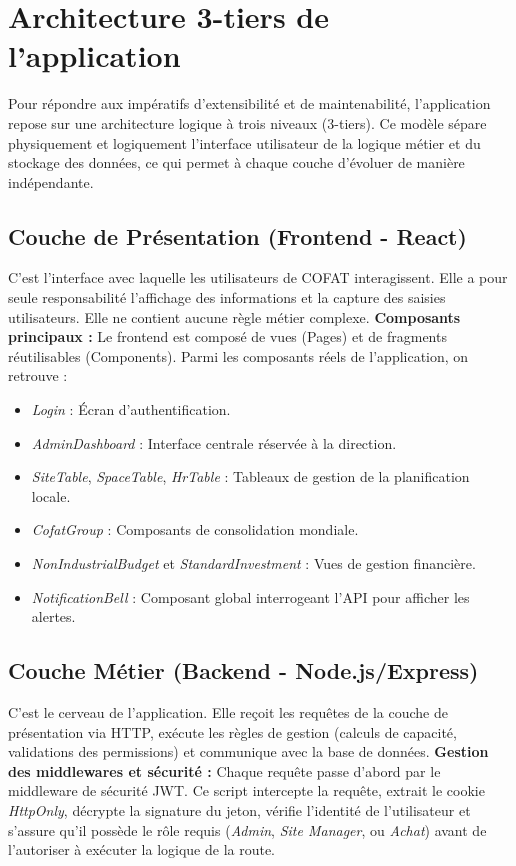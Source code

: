 \section{Architecture 3-tiers de l'application}
Pour répondre aux impératifs d'extensibilité et de maintenabilité, l'application repose sur une architecture logique à trois niveaux (3-tiers). Ce modèle sépare physiquement et logiquement l'interface utilisateur de la logique métier et du stockage des données, ce qui permet à chaque couche d'évoluer de manière indépendante.

\subsection{Couche de Présentation (Frontend - React)}
C'est l'interface avec laquelle les utilisateurs de COFAT interagissent. Elle a pour seule responsabilité l'affichage des informations et la capture des saisies utilisateurs. Elle ne contient aucune règle métier complexe.
\newline
\textbf{Composants principaux :} Le frontend est composé de vues (Pages) et de fragments réutilisables (Components). Parmi les composants réels de l'application, on retrouve :
\begin{itemize}
    \item \textit{Login} : Écran d'authentification.
    \item \textit{AdminDashboard} : Interface centrale réservée à la direction.
    \item \textit{SiteTable}, \textit{SpaceTable}, \textit{HrTable} : Tableaux de gestion de la planification locale.
    \item \textit{CofatGroup} : Composants de consolidation mondiale.
    \item \textit{NonIndustrialBudget} et \textit{StandardInvestment} : Vues de gestion financière.
    \item \textit{NotificationBell} : Composant global interrogeant l'API pour afficher les alertes.
\end{itemize}

\subsection{Couche Métier (Backend - Node.js/Express)}
C'est le cerveau de l'application. Elle reçoit les requêtes de la couche de présentation via HTTP, exécute les règles de gestion (calculs de capacité, validations des permissions) et communique avec la base de données.
\newline
\textbf{Gestion des middlewares et sécurité :} Chaque requête passe d'abord par le middleware de sécurité JWT. Ce script intercepte la requête, extrait le cookie \textit{HttpOnly}, décrypte la signature du jeton, vérifie l'identité de l'utilisateur et s'assure qu'il possède le rôle requis (\textit{Admin}, \textit{Site Manager}, ou \textit{Achat}) avant de l'autoriser à exécuter la logique de la route.

